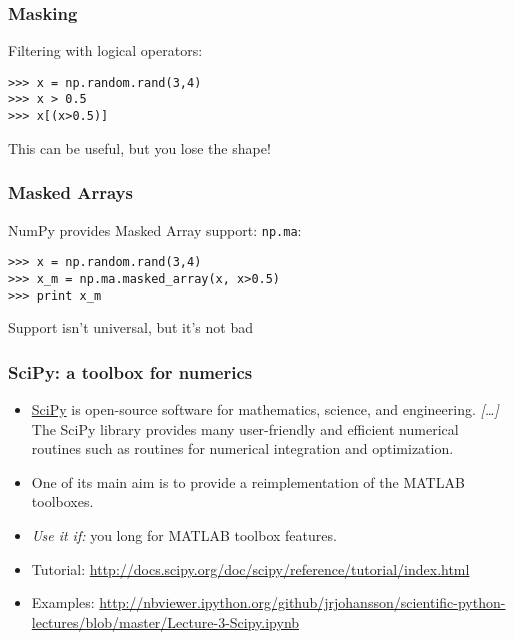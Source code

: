 \begin{frame}[fragile]\frametitle{Masking}

    Filtering with logical operators:
    \begin{lstlisting}
>>> x = np.random.rand(3,4)
>>> x > 0.5
>>> x[(x>0.5)]
    \end{lstlisting}
    This can be useful, but you lose the shape!
\end{frame}

\begin{frame}[fragile]\frametitle{Masked Arrays}

    NumPy provides Masked Array support: \lstinline|np.ma|:
    \begin{lstlisting}
>>> x = np.random.rand(3,4)
>>> x_m = np.ma.masked_array(x, x>0.5)
>>> print x_m
    \end{lstlisting}
    Support isn't universal, but it's not bad
\end{frame}


\begin{frame}[fragile]\frametitle{SciPy: a toolbox for numerics}

 \begin{itemize}
\item    \href{http://www.scipy.org}{SciPy} is open-source software for
  mathematics, science, and engineering. \emph{[\ldots]} The SciPy
  library provides many user-friendly and efficient numerical routines
  such as routines for numerical integration and optimization.

\item    One of its main aim is to provide a reimplementation of the
  MATLAB toolboxes.

\item     \emph{Use it if:} you long for MATLAB toolbox features.


  \item Tutorial: {\scriptsize\url{http://docs.scipy.org/doc/scipy/reference/tutorial/index.html}}
  \item Examples: {\scriptsize\url{http://nbviewer.ipython.org/github/jrjohansson/scientific-python-lectures/blob/master/Lecture-3-Scipy.ipynb}}
  \end{itemize}
\end{frame}

